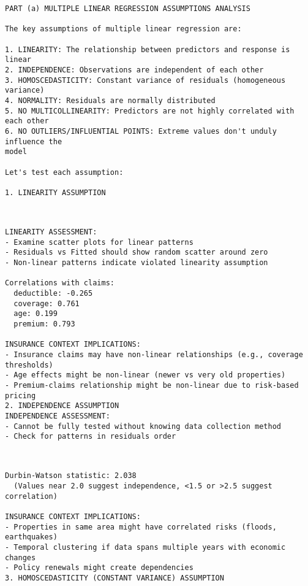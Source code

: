 \documentclass[8pt, twocolumn]{extarticle}
\begin{document}
    \begin{Verbatim}[commandchars=\\\{\}]
PART (a) MULTIPLE LINEAR REGRESSION ASSUMPTIONS ANALYSIS

The key assumptions of multiple linear regression are:

1. LINEARITY: The relationship between predictors and response is linear
2. INDEPENDENCE: Observations are independent of each other
3. HOMOSCEDASTICITY: Constant variance of residuals (homogeneous variance)
4. NORMALITY: Residuals are normally distributed
5. NO MULTICOLLINEARITY: Predictors are not highly correlated with each other
6. NO OUTLIERS/INFLUENTIAL POINTS: Extreme values don't unduly influence the
model

Let's test each assumption:

1. LINEARITY ASSUMPTION
    \end{Verbatim}
    \begin{center}
    \end{center}
    { \hspace*{\fill} \\}
    \begin{Verbatim}[commandchars=\\\{\}]
LINEARITY ASSESSMENT:
- Examine scatter plots for linear patterns
- Residuals vs Fitted should show random scatter around zero
- Non-linear patterns indicate violated linearity assumption

Correlations with claims:
  deductible: -0.265
  coverage: 0.761
  age: 0.199
  premium: 0.793

INSURANCE CONTEXT IMPLICATIONS:
- Insurance claims may have non-linear relationships (e.g., coverage thresholds)
- Age effects might be non-linear (newer vs very old properties)
- Premium-claims relationship might be non-linear due to risk-based pricing
2. INDEPENDENCE ASSUMPTION
INDEPENDENCE ASSESSMENT:
- Cannot be fully tested without knowing data collection method
- Check for patterns in residuals order
    \end{Verbatim}
    \begin{center}
    \end{center}
    { \hspace*{\fill} \\}
    \begin{Verbatim}[commandchars=\\\{\}]
Durbin-Watson statistic: 2.038
  (Values near 2.0 suggest independence, <1.5 or >2.5 suggest correlation)

INSURANCE CONTEXT IMPLICATIONS:
- Properties in same area might have correlated risks (floods, earthquakes)
- Temporal clustering if data spans multiple years with economic changes
- Policy renewals might create dependencies
3. HOMOSCEDASTICITY (CONSTANT VARIANCE) ASSUMPTION
    \end{Verbatim}
\end{document}
